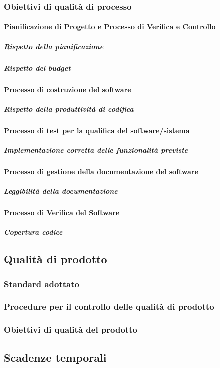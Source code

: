 		\subsubsection{Obiettivi di qualità di processo}
			\paragraph{Pianificazione di Progetto e Processo di Verifica e Controllo }
				\subparagraph{Rispetto della pianificazione}
				\subparagraph{Rispetto del budget}
			\paragraph{Processo di costruzione del software}
				\subparagraph{Rispetto della produttività di codifica}
			\paragraph{Processo di test per la qualifica del software/sistema}
				\subparagraph{Implementazione corretta delle funzionalità previste}
			\paragraph{Processo di gestione della documentazione del software}
				\subparagraph{Leggibilità della documentazione}
			\paragraph{Processo di Verifica del Software}
				\subparagraph{Copertura codice}
	\subsection{Qualità di prodotto}
		\subsubsection{Standard adottato}
		\subsubsection{Procedure per il controllo delle qualità di prodotto}
		\subsubsection{Obiettivi di qualità del prodotto}
	\subsection{Scadenze temporali}
\newpage
